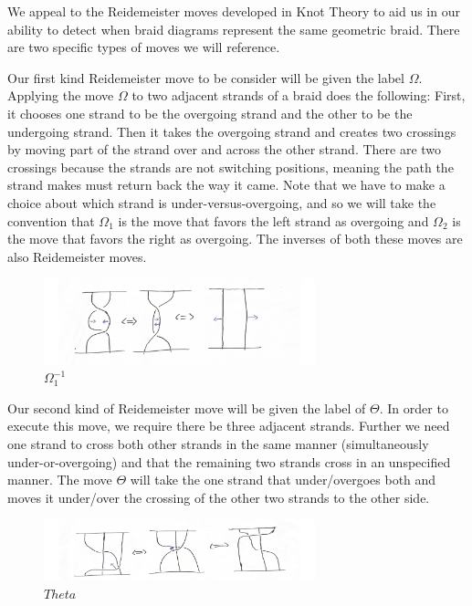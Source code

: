 \documentclass[10pt]{ucthesis}
\begin{document}
We appeal to the Reidemeister moves developed in Knot Theory to aid us in our ability to detect when braid diagrams represent the same geometric braid. There are two specific types of moves we will reference.

Our first kind Reidemeister move to be consider will be given the label $\Omega$. Applying the move $\Omega$ to two adjacent strands of a braid does the following: First, it chooses one strand to be the overgoing strand and the other to be the undergoing strand. Then it takes the overgoing strand and creates two crossings by moving part of the strand over and across the other strand. There are two crossings because the strands are not switching positions, meaning the path the strand makes must return back the way it came. Note that we have to make a choice about which strand is under-versus-overgoing, and so we will take the convention that $\Omega_1$ is the move that favors the left strand as overgoing and $\Omega_2$ is the move that favors the right as overgoing. The inverses of both these moves are also Reidemeister moves.

\begin{figure}[H]
	\centering
	\includegraphics[width=0.7\textwidth]{reidmove2.png}
	\caption{$\Omega_1^{-1}$}
\end{figure}

Our second kind of Reidemeister move will be given the label of $\Theta$. In order to execute this move, we require there be three adjacent strands. Further we need one strand to cross both other strands in the same manner (simultaneously under-or-overgoing) and that the remaining two strands cross in an unspecified manner. The move $\Theta$ will take the one strand that under/overgoes both and moves it under/over the crossing of the other two strands to the other side. 

\begin{figure}[H]
	\centering
	\includegraphics[width=0.7\textwidth]{reidmove3.png}
	\caption{$Theta$}
\end{figure}
\end{document}
